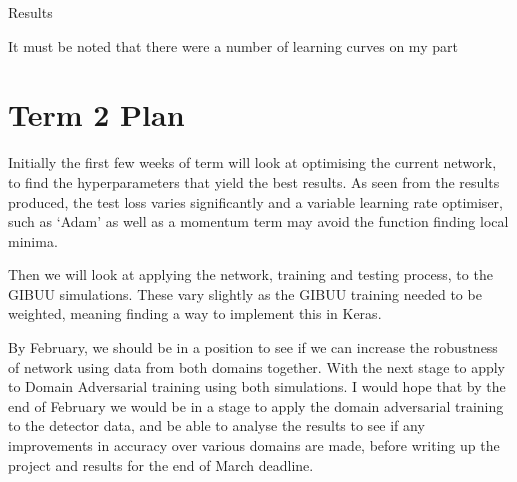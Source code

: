 \documentclass[11pt]{article}
\begin{document}
Results

It must be noted that there were a number of learning curves on my part  


\section*{Term 2 Plan}

Initially the first few weeks of term will look at optimising the current network, to find the hyperparameters that yield the best results. As seen from the results produced, the test loss varies significantly and a variable learning rate optimiser, such as ‘Adam’ as well as a momentum term may avoid the function finding local minima.

Then we will look at applying the network, training and testing process, to the GIBUU simulations. These vary slightly as the GIBUU training needed to be weighted, meaning finding a way to implement this in Keras.

By February, we should be in a position to see if we can increase the robustness of network using data from both domains together. With the next stage to apply to Domain Adversarial training using both simulations. I would hope that by the end of February we would be in a stage to apply the domain adversarial training to the detector data, and be able to analyse the results to see if any improvements in accuracy over various domains are made, before writing up the project and results for the end of March deadline.




 
\end{document}
